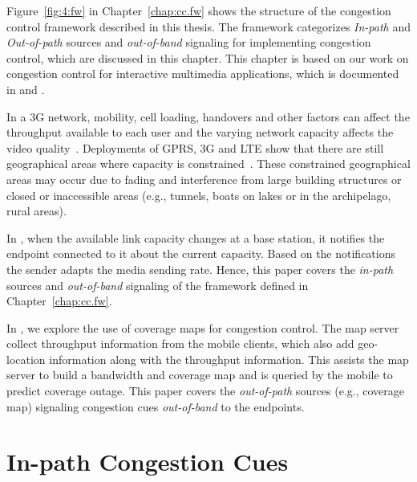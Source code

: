 Figure~\ref{fig:4:fw} in Chapter~\ref{chap:cc.fw} shows the structure of the
congestion control framework described in this thesis. The framework
categorizes \emph{In-path} and \emph{Out-of-path} sources and
\emph{out-of-band} signaling for implementing congestion control, which are
discussed in this chapter. This chapter is based on our work on congestion
control for interactive multimedia applications, which is documented in
 and .

In a 3G network, mobility, cell loading, handovers and other factors can
affect the throughput available to each user and the varying network capacity
affects the video quality~\cite{diaz2007evaluating}. Deployments of GPRS, 3G
and LTE show that there are still geographical areas where capacity is
constrained~\cite{Curcio:glass, 6576402}. These constrained geographical areas
may occur due to fading and interference from large building structures or
closed or inaccessible areas (e.g., tunnels, boats on lakes or in the
archipelago, rural areas).

In , when the available link capacity changes at a base
station, it notifies the endpoint connected to it about the current capacity.
Based on the notifications the sender adapts the media sending rate. Hence,
this paper covers the \emph{in-path} sources and \emph{out-of-band} signaling
of the framework defined in Chapter~\ref{chap:cc.fw}.

In , we explore the use of coverage maps for congestion
control. The map server collect throughput information from the mobile
clients, which also add geo-location information along with the throughput
information. This assists the map server to build a bandwidth and coverage map
and is queried by the mobile to predict coverage outage. This paper covers the
\emph{out-of-path} sources (e.g., coverage map) signaling congestion cues
\emph{out-of-band} to the endpoints.

\section{In-path Congestion Cues}


